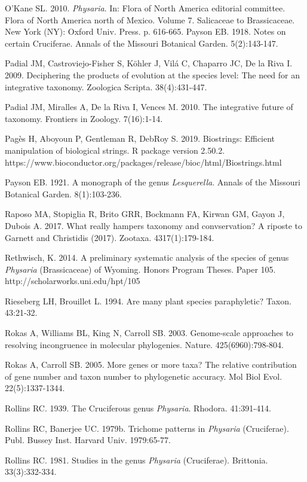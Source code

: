 O’Kane SL. 2010. \textit{Physaria}. In: Flora of North America editorial committee. Flora of North America north of Mexico. Volume 7. Salicaceae to Brassicaceae. New York (NY): Oxford Univ. Press. p. 616-665. 
Payson EB. 1918. Notes on certain Cruciferae. Annals of the Missouri Botanical Garden. 5(2):143-147.

Padial JM, Castroviejo-Fisher S, Köhler J, Vilá C, Chaparro JC, De la Riva I. 2009. Deciphering the products of evolution at the species level: The need for an integrative taxonomy. Zoologica Scripta. 38(4):431-447.

Padial JM, Miralles A, De la Riva I, Vences M. 2010. The integrative future of taxonomy. Frontiers in Zoology. 7(16):1-14.

Pagès H, Aboyoun P, Gentleman R, DebRoy S. 2019. Biostrings: Efficient manipulation of biological strings. R package version 2.50.2. https://www.bioconductor.org/packages/release/bioc/html/Biostrings.html 

Payson EB. 1921. A monograph of the genus \textit{Lesquerella}. Annals of the Missouri Botanical Garden. 8(1):103-236.

Raposo MA, Stopiglia R, Brito GRR, Bockmann FA, Kirwan GM, Gayon J, Dubois A. 2017. What really hampers taxonomy and convservation? A riposte to Garnett and Christidis (2017). Zootaxa. 4317(1):179-184.

Rethwisch, K. 2014. A preliminary systematic analysis of the species of genus \textit{Physaria} (Brassicaceae) of Wyoming. Honors Program Theses. Paper 105.
http://scholarworks.uni.edu/hpt/105

Rieseberg LH, Brouillet L. 1994. Are many plant species paraphyletic? Taxon. 43:21-32.

Rokas A, Williams BL, King N, Carroll SB. 2003. Genome-scale approaches to resolving incongruence in molecular phylogenies. Nature. 425(6960):798-804.

Rokas A, Carroll SB. 2005. More genes or more taxa? The relative contribution of gene number and taxon number to phylogenetic accuracy. Mol Biol Evol. 22(5):1337-1344.

Rollins RC. 1939. The Cruciferous genus \textit{Physaria}. Rhodora. 41:391-414.

Rollins RC, Banerjee UC. 1979b. Trichome patterns in \textit{Physaria} (Cruciferae). Publ. Bussey Inst. Harvard Univ. 1979:65-77.

Rollins RC. 1981. Studies in the genus \textit{Physaria} (Cruciferae). Brittonia. 33(3):332-334.

